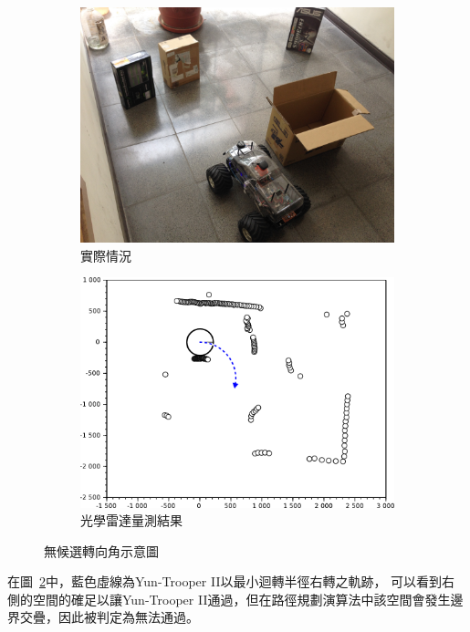 \begin{figure}[h!]
	\centering
	\begin{subfigure}[t]{0.48\textwidth}
		\includegraphics[width=\textwidth]{figures/NoWayToGo_Real}
		\caption{實際情況}
		\label{f:no_way_to_go_real}
	\end{subfigure}
	\begin{subfigure}[t]{0.48\textwidth}
		\includegraphics[width=\textwidth]{figures/NoWayToGo}
		\caption{光學雷達量測結果}
		\label{f:no_way_to_go_measured}
	\end{subfigure}
	\caption{無候選轉向角示意圖}
	\label{f:no_way_to_go}
\end{figure}
在圖~\ref{f:no_way_to_go_measured}中，藍色虛線為Yun-Trooper II以最小迴轉半徑右轉之軌跡，
可以看到右側的空間的確足以讓Yun-Trooper II通過，但在路徑規劃演算法中該空間會發生邊界交疊，因此被判定為無法通過。

